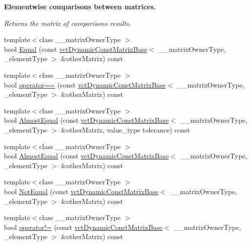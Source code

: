 \begin{Indent}{\bf Elementwise comparisons between matrices.}\par
{\em Returns the matrix of comparison\textquotesingle{}s results. }\begin{DoxyCompactItemize}
\item 
{\footnotesize template$<$class \+\_\+\+\_\+matrix\+Owner\+Type $>$ }\\bool \hyperlink{classvct_dynamic_const_matrix_base_a62b4d925e04660013111852723b4e945}{Equal} (const \hyperlink{classvct_dynamic_const_matrix_base}{vct\+Dynamic\+Const\+Matrix\+Base}$<$ \+\_\+\+\_\+matrix\+Owner\+Type, \+\_\+element\+Type $>$ \&other\+Matrix) const 
\item 
{\footnotesize template$<$class \+\_\+\+\_\+matrix\+Owner\+Type $>$ }\\bool \hyperlink{classvct_dynamic_const_matrix_base_af6c4ce73e91bc3bb169e8883b7b1606a}{operator==} (const \hyperlink{classvct_dynamic_const_matrix_base}{vct\+Dynamic\+Const\+Matrix\+Base}$<$ \+\_\+\+\_\+matrix\+Owner\+Type, \+\_\+element\+Type $>$ \&other\+Matrix) const 
\item 
{\footnotesize template$<$class \+\_\+\+\_\+matrix\+Owner\+Type $>$ }\\bool \hyperlink{classvct_dynamic_const_matrix_base_a887b96b2d9c5f9b08ef92203e1195cd5}{Almost\+Equal} (const \hyperlink{classvct_dynamic_const_matrix_base}{vct\+Dynamic\+Const\+Matrix\+Base}$<$ \+\_\+\+\_\+matrix\+Owner\+Type, \+\_\+element\+Type $>$ \&other\+Matrix, value\+\_\+type tolerance) const 
\item 
{\footnotesize template$<$class \+\_\+\+\_\+matrix\+Owner\+Type $>$ }\\bool \hyperlink{classvct_dynamic_const_matrix_base_ad6a335d713fdc202e2cae3998944b580}{Almost\+Equal} (const \hyperlink{classvct_dynamic_const_matrix_base}{vct\+Dynamic\+Const\+Matrix\+Base}$<$ \+\_\+\+\_\+matrix\+Owner\+Type, \+\_\+element\+Type $>$ \&other\+Matrix) const 
\item 
{\footnotesize template$<$class \+\_\+\+\_\+matrix\+Owner\+Type $>$ }\\bool \hyperlink{classvct_dynamic_const_matrix_base_a44f8f00e7b7ff300180ee323f0ea035a}{Not\+Equal} (const \hyperlink{classvct_dynamic_const_matrix_base}{vct\+Dynamic\+Const\+Matrix\+Base}$<$ \+\_\+\+\_\+matrix\+Owner\+Type, \+\_\+element\+Type $>$ \&other\+Matrix) const 
\item 
{\footnotesize template$<$class \+\_\+\+\_\+matrix\+Owner\+Type $>$ }\\bool \hyperlink{classvct_dynamic_const_matrix_base_ab79413902e9274c1a252e41aa8431593}{operator!=} (const \hyperlink{classvct_dynamic_const_matrix_base}{vct\+Dynamic\+Const\+Matrix\+Base}$<$ \+\_\+\+\_\+matrix\+Owner\+Type, \+\_\+element\+Type $>$ \&other\+Matrix) const 

\end{DoxyCompactItemize}
\end{Indent}
